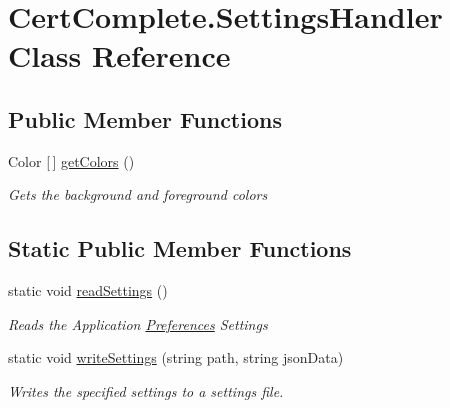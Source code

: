 \hypertarget{class_cert_complete_1_1_settings_handler}{}\section{Cert\+Complete.\+Settings\+Handler Class Reference}
\label{class_cert_complete_1_1_settings_handler}
\subsection*{Public Member Functions}
\begin{DoxyCompactItemize}
\item 
Color \mbox{[}$\,$\mbox{]} \mbox{\hyperlink{class_cert_complete_1_1_settings_handler_afe216c240ce24c1925eaa84b8f48348c}{get\+Colors}} ()
\begin{DoxyCompactList}\small\item\em Gets the background and foreground colors \end{DoxyCompactList}\end{DoxyCompactItemize}
\subsection*{Static Public Member Functions}
\begin{DoxyCompactItemize}
\item 
static void \mbox{\hyperlink{class_cert_complete_1_1_settings_handler_add6b4bc1381202fdcb0bc8c1b4af65cc}{read\+Settings}} ()
\begin{DoxyCompactList}\small\item\em Reads the Application \mbox{\hyperlink{class_cert_complete_1_1_preferences}{Preferences}} Settings \end{DoxyCompactList}\item 
static void \mbox{\hyperlink{class_cert_complete_1_1_settings_handler_acd1a07ef04d7ed341a0b30e68ed83371}{write\+Settings}} (string path, string json\+Data)
\begin{DoxyCompactList}\small\item\em Writes the specified settings to a settings file. \end{DoxyCompactList}\end{DoxyCompactItemize}
